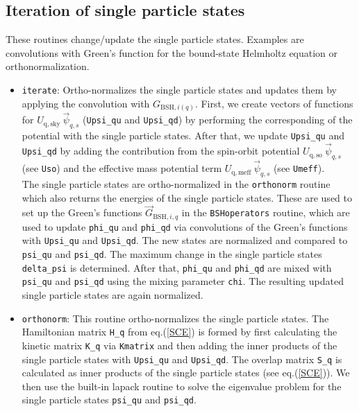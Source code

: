 \documentclass[3p]{elsarticle}
\begin{document}
\subsection{Iteration of single particle states}
These routines change/update the single particle states. Examples are convolutions with Green's function for the bound-state Helmholtz equation or orthonormalization.
\begin{itemize}
\item \texttt{iterate}: Ortho-normalizes the single particle states and updates them by applying the convolution with $G_{\mathrm{BSH},i(q)}$.
First, we create vectors of functions for $U_\mathrm{q,sky} \: \vec{\psi}_{q,s}$ (\texttt{Upsi\_qu} and \texttt{Upsi\_qd}) by performing the corresponding of the potential with the single particle states.  After that, we update \texttt{Upsi\_qu} and \texttt{Upsi\_qd} by adding the contribution from the spin-orbit potential $U_\mathrm{q, so} \: \vec{\psi}_{q,s}$ (see \texttt{Uso}) and the effective mass potential term  $U_\mathrm{q, meff} \: \vec{\psi}_{q,s}$ (see \texttt{Umeff}).\\ 
The single particle states are ortho-normalized in the \texttt{orthonorm} routine which also returns the energies of the single particle states. These are used to set up the Green's functions $\vec{G}_{\mathrm{BSH}, i, q}$ in the \texttt{BSHoperators} routine, which are used to update \texttt{phi\_qu} and \texttt{phi\_qd} via convolutions of the Green's functions with \texttt{Upsi\_qu} and \texttt{Upsi\_qd}. The new states are normalized and compared to \texttt{psi\_qu} and \texttt{psi\_qd}. The maximum change in the single particle states \texttt{delta\_psi} is determined. After that, \texttt{phi\_qu} and \texttt{phi\_qd} are mixed with \texttt{psi\_qu} and \texttt{psi\_qd} using the mixing parameter \texttt{chi}. The resulting updated single particle states are again normalized. 
\item \texttt{orthonorm}: This routine ortho-normalizes the single particle states. The Hamiltonian matrix \texttt{H\_q} from eq.(\ref{SCE}) is formed by first calculating the kinetic matrix \texttt{K\_q} via \texttt{Kmatrix} and then adding the inner products of the single particle states with \texttt{Upsi\_qu} and \texttt{Upsi\_qd}. The overlap matrix \texttt{S\_q} is calculated as inner products of the single particle states (see eq.(\ref{SCE})). We then use the built-in lapack routine to solve the eigenvalue problem for the single particle states \texttt{psi\_qu} and \texttt{psi\_qd}.\\

\end{itemize}
\end{document}
